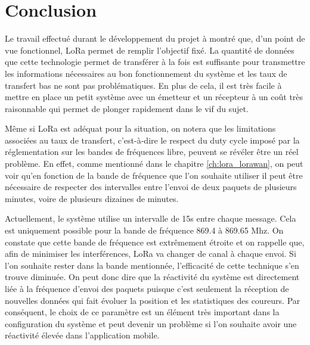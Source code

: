 
\chapter{Conclusion}

Le travail effectué durant le développement du projet à montré que, d'un point de vue fonctionnel, LoRa permet de remplir l'objectif fixé. La quantité de données que cette technologie permet de transférer à la fois est suffisante pour transmettre les informations nécessaires au bon fonctionnement du système et les taux de transfert bas ne sont pas problématiques. En plus de cela, il est très facile à mettre en place un petit système avec un émetteur et un récepteur à un coût très raisonnable qui permet de plonger rapidement dans le vif du sujet.

Même si LoRa est adéquat pour la situation, on notera que les limitations associées au taux de transfert, c'est-à-dire le respect du duty cycle imposé par la réglementation sur les bandes de fréquences libre, peuvent se révéler être un réel problème. En effet, comme mentionné dans le chapitre \ref{ch:lora_lorawan}, on peut voir qu'en fonction de la bande de fréquence que l'on souhaite utiliser il peut être nécessaire de respecter des intervalles entre l'envoi de deux paquets de plusieurs minutes, voire de plusieurs dizaines de minutes.

Actuellement, le système utilise un intervalle de 15s entre chaque message. Cela est uniquement possible pour la bande de fréquence 869.4 à 869.65 Mhz. On constate que cette bande de fréquence est extrêmement étroite et on rappelle que, afin de minimiser les interférences, LoRa va changer de canal à chaque envoi. Si l'on souhaite rester dans la bande mentionnée, l’efficacité de cette technique s’en trouve diminuée. On peut donc dire que la réactivité du système est directement liée à la fréquence d'envoi des paquets puisque c'est seulement la réception de nouvelles données qui fait évoluer la position et les statistiques des coureurs. Par conséquent, le choix de ce paramètre est un élément très important dans la configuration du système et peut devenir un problème si l'on souhaite avoir une réactivité élevée dans l'application mobile.

